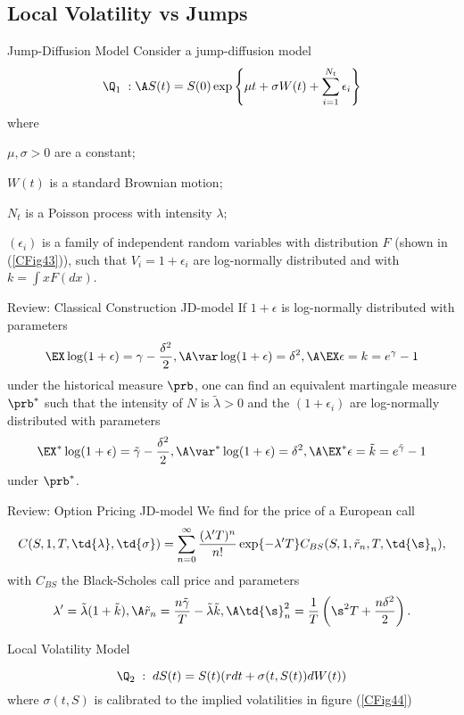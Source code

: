 
\subsection{Local Volatility vs Jumps}

{Jump-Diffusion Model}
Consider a jump-diffusion model
\begin{equation}\label{jump-diffusion-model}
\Q_1\; : \A S(t)=S(0) \exp\left\{\mu t + \sigma  W(t) + \sum_{i=1}^{N_t} \epsilon_i\right\}
\end{equation}
where
\item $\mu, \sigma>0$ are a constant;
\item $W(t)$ is a standard Brownian motion;
\item $N_t$ is a Poisson process with intensity $\lambda$;
\item $(\epsilon_i)$ is a family of independent random variables with distribution $F$
(shown in (\ref{CFig43})), such that
$V_i= 1+\epsilon_i$ are log-normally distributed and
with $k = \int x F(dx)$.

{Review: Classical Construction JD-model}
If $1+\epsilon$ is log-normally distributed  with parameters
$$
\EX\log(1+\epsilon)= \gamma-\frac{\delta^2}{2},\A
\var\log(1+\epsilon)=\delta^2, \A \EX\epsilon=k=e^\gamma-1
$$
under the historical measure $\prb$, one can find an equivalent
martingale measure $\prb^*$ such that the intensity of $N$ is
$\tilde{\lambda}>0$ and the $(1+\epsilon_i)$ are log-normally
distributed with parameters
$$
\EX^*\log(1+\epsilon)= \tilde{\gamma}-\frac{\delta^2}{2},\A
\var^*\log(1+\epsilon)=\delta^2, \A
\EX^*\epsilon=\tilde{k}=e^{\tilde{\gamma}}-1
$$
under $\prb^*$.

{Review: Option Pricing JD-model}
We find for the price of a European call
$$
C(S, 1, T, \td{\lambda}, \td{\sigma}) = \sum_{n=0}^\infty
\frac{(\lambda' T)^n }{n!} \exp\{-\lambda' T\}
C_{BS}(S,1,\tilde{r}_n,T,\td{\s}_n),
$$
with $C_{BS}$ the Black-Scholes call price and parameters
$$
\lambda'=\tilde{\lambda}(1+\tilde{k}),\A \tilde{r}_n=
\frac{n\tilde{\gamma}}{T}-\tilde{\lambda}\tilde{k},\A \td{\s}_n^2
= \frac{1}{T}\left(\s^2T +\frac{n\delta^2}{2}\right).
$$

{Local Volatility Model}
\item<1->
\begin{equation}\label{Local-Volatility Model}
\Q_2\;:\; dS(t) = S(t)(r dt + \sigma(t, S(t)) dW(t))
\end{equation}
where $ \sigma(t, S)$ is calibrated to the implied volatilities in figure (\ref{CFig44})

